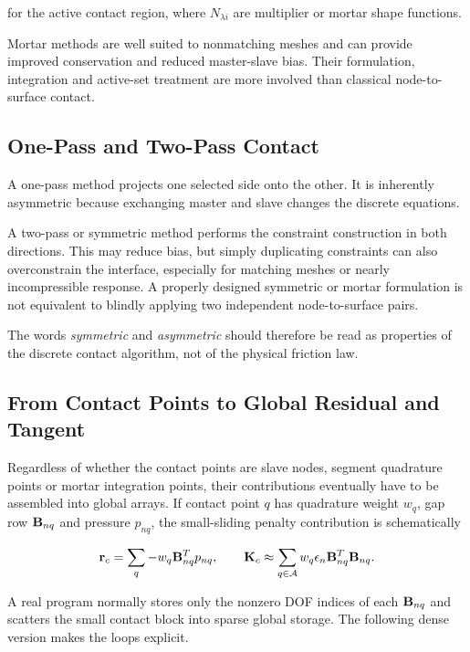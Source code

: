 for the active contact region, where $ N_{\lambda i} $ are multiplier or mortar
shape functions.

Mortar methods are well suited to nonmatching meshes and can provide improved
conservation and reduced master-slave bias. Their formulation, integration and
active-set treatment are more involved than classical node-to-surface contact.

\subsection{One-Pass and Two-Pass Contact}

A one-pass method projects one selected side onto the other. It is inherently
asymmetric because exchanging master and slave changes the discrete equations.

A two-pass or symmetric method performs the constraint construction in both
directions. This may reduce bias, but simply duplicating constraints can also
overconstrain the interface, especially for matching meshes or nearly
incompressible response. A properly designed symmetric or mortar formulation is
not equivalent to blindly applying two independent node-to-surface pairs.

The words \textit{symmetric} and \textit{asymmetric} should therefore be read as
properties of the discrete contact algorithm, not of the physical friction law.


\subsection{From Contact Points to Global Residual and Tangent}

Regardless of whether the contact points are slave nodes, segment quadrature
points or mortar integration points, their contributions eventually have to be
assembled into global arrays. If contact point $q$ has quadrature weight $w_q$,
gap row $\mathbf{B}_{nq}$ and pressure $p_{nq}$, the small-sliding penalty
contribution is schematically

\begin{equation}
    \mathbf{r}_c = \sum_q -w_q\mathbf{B}_{nq}^T p_{nq},
    \qquad
    \mathbf{K}_c \approx \sum_{q\in\mathcal A}
        w_q\epsilon_n\mathbf{B}_{nq}^T\mathbf{B}_{nq}.
\end{equation}

A real program normally stores only the nonzero DOF indices of each
$\mathbf{B}_{nq}$ and scatters the small contact block into sparse global storage.
The following dense version makes the loops explicit.

